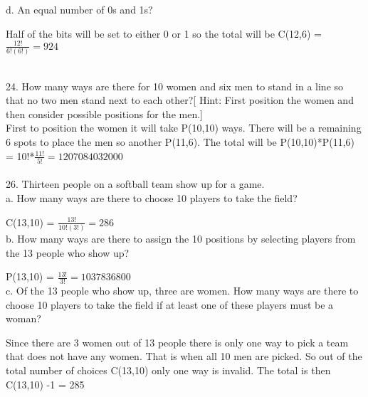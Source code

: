 \documentclass{article}
\begin{document}
d. An equal number of 0s and 1s?

Half of the bits will be set to either 0 or 1 so the total will be C(12,6) = $\frac{12!}{6!(6!)} = 924 $\\

\hrulefill\\
\newpage

24. How many ways are there for 10 women and six men to stand in a line so that no two
men stand next to each other?[
Hint:
First position the women and then consider possible
positions for the men.]\\

First to position the women it will take P(10,10) ways.  There will be a remaining 6 spots to place the men so another P(11,6).  The total will be P(10,10)*P(11,6) = 10!*$\frac{11!}{5!} = 1207084032000$\\

\hrulefill\\

26. Thirteen people on a softball team show up for a game. \\

a. How many ways are there to choose 10 players to take the field?

C(13,10) = $\frac{13!}{10!(3!)} = 286$\\

b. How many ways are there to assign the 10 positions by selecting players from the 13
people who show up? 

P(13,10) = $\frac{13!}{3!} = 1037836800 $\\

c. Of the 13 people who show up, three are women. How many ways are there to choose
10 players to take the field if at least one of these players must be a woman?

Since there are 3 women out of 13 people there is only one way to pick a team that does not have any women.  That is when all 10 men are picked.  So out of the total number of choices C(13,10) only one way is invalid.  The total is then C(13,10) -1 = 285
\end{document}

